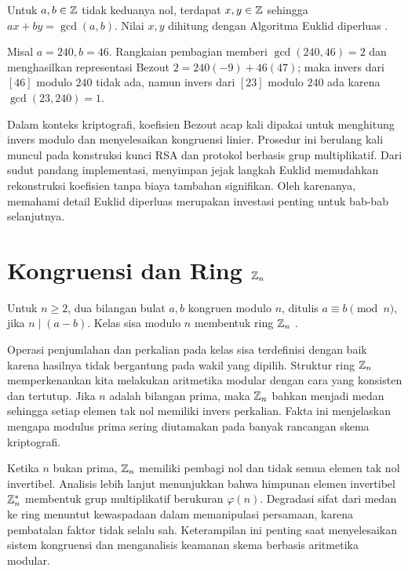 \documentclass[../main.tex]{subfiles}
\begin{document}
\begin{theorem}
Untuk \(a,b\in\mathbb{Z}\) tidak keduanya nol, terdapat \(x,y\in\mathbb{Z}\) sehingga \(ax+by=\gcd(a,b)\). Nilai \(x,y\) dihitung dengan Algoritma Euklid diperluas \citep{hoffstein}.
\end{theorem}

\begin{example}
Misal \(a=240,b=46\). Rangkaian pembagian memberi \(\gcd(240,46)=2\) dan menghasilkan representasi Bezout \(2=240(-9)+46(47)\); maka invers dari \([46]\) modulo \(240\) tidak ada, namun invers dari \([23]\) modulo \(240\) ada karena \(\gcd(23,240)=1\).
\end{example}

Dalam konteks kriptografi, koefisien Bezout acap kali dipakai untuk menghitung invers modulo dan menyelesaikan kongruensi linier. Prosedur ini berulang kali muncul pada konstruksi kunci RSA dan protokol berbasis grup multiplikatif. Dari sudut pandang implementasi, menyimpan jejak langkah Euklid memudahkan rekonstruksi koefisien tanpa biaya tambahan signifikan. Oleh karenanya, memahami detail Euklid diperluas merupakan investasi penting untuk bab-bab selanjutnya.

\section{Kongruensi dan Ring \(\mathbb{Z}_n\)}
\begin{definition}[Kongruensi]
Untuk \(n\ge 2\), dua bilangan bulat \(a,b\) kongruen modulo \(n\), ditulis \(a\equiv b \pmod n\), jika \(n\mid (a-b)\). Kelas sisa modulo \(n\) membentuk ring \(\mathbb{Z}_n\) \citep{hoffstein}.
\end{definition}

Operasi penjumlahan dan perkalian pada kelas sisa terdefinisi dengan baik karena hasilnya tidak bergantung pada wakil yang dipilih. Struktur ring \(\mathbb{Z}_n\) memperkenankan kita melakukan aritmetika modular dengan cara yang konsisten dan tertutup. Jika \(n\) adalah bilangan prima, maka \(\mathbb{Z}_n\) bahkan menjadi medan sehingga setiap elemen tak nol memiliki invers perkalian. Fakta ini menjelaskan mengapa modulus prima sering diutamakan pada banyak rancangan skema kriptografi.

Ketika \(n\) bukan prima, \(\mathbb{Z}_n\) memiliki pembagi nol dan tidak semua elemen tak nol invertibel. Analisis lebih lanjut menunjukkan bahwa himpunan elemen invertibel \(\mathbb{Z}_n^*\) membentuk grup multiplikatif berukuran \(\varphi(n)\). Degradasi sifat dari medan ke ring menuntut kewaspadaan dalam memanipulasi persamaan, karena pembatalan faktor tidak selalu sah. Keterampilan ini penting saat menyelesaikan sistem kongruensi dan menganalisis keamanan skema berbasis aritmetika modular.
\end{document}
